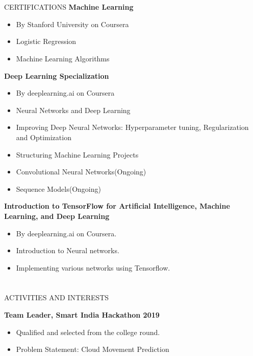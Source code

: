 \documentclass{my_cv}
\begin{document}
\begin{multicols}{2}

	\section{\faCertificate}{CERTIFICATIONS}
		\noindent	
		\textbf{\aiCoursera\hspace{1mm} Machine Learning}
		\begin{itemize}
			\item By Stanford University on Coursera
			\item Logistic Regression
			\item Machine Learning Algorithms
		\end{itemize}
		
		\noindent
		\textbf{\aiCoursera\hspace{1mm} Deep Learning Specialization}
		\begin{itemize}
			\item By deeplearning.ai on Coursera
			\item Neural Networks and Deep Learning
			\item Improving Deep Neural Networks: Hyperparameter tuning, Regularization and Optimization
			\item Structuring Machine Learning Projects
			\item Convolutional Neural Networks(Ongoing)
			\item Sequence Models(Ongoing)
		\end{itemize}
	
		
		\noindent
		\textbf{\aiCoursera\hspace{1mm}Introduction to TensorFlow for Artificial Intelligence, Machine Learning, and Deep Learning}
		\begin{itemize}
			\item By deeplearning.ai on Coursera.
			\item Introduction to Neural networks.
			\item Implementing various networks using Tensorflow.
		\end{itemize}
		
	\columnbreak
		
	\section{\faBaseballBall}{ACTIVITIES AND INTERESTS}
		
		\noindent
		\textbf{Team Leader, Smart India Hackathon 2019}
		\begin{itemize}
			\item Qualified and selected from the college round.
			\item Problem Statement: Cloud Movement Prediction
		\end{itemize}
		

\end{multicols}
\end{document}
